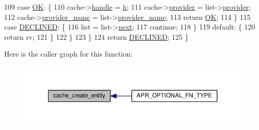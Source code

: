 \begin{DoxyCode}
109         \textcolor{keywordflow}{case} \hyperlink{group__APACHE__CORE__DAEMON_gaba51915c87d64af47fb1cc59348961c9}{OK}: \{
110             cache->\hyperlink{structcache__request__rec_ade71ff36fe9a713fd081fa45524151f1}{handle} = \hyperlink{group__apr__hash_ga0d6dcb41ca5e794b318df5f6fd273ee2}{h};
111             cache->\hyperlink{structcache__request__rec_aa97c7f2b0167adee182cce9f2c66b0eb}{provider} = list->\hyperlink{structcache__provider__list_a1e1caa5b70698f255962728326dc1be3}{provider};
112             cache->\hyperlink{structcache__request__rec_ad15b24a12858815a315f37152111b41d}{provider\_name} = list->\hyperlink{structcache__provider__list_a0bd2adbaa02f1aa6af1971fd24b09b6a}{provider\_name};
113             \textcolor{keywordflow}{return} \hyperlink{group__APACHE__CORE__DAEMON_gaba51915c87d64af47fb1cc59348961c9}{OK};
114         \}
115         \textcolor{keywordflow}{case} \hyperlink{group__APACHE__CORE__DAEMON_ga9eba11ca86461a3ae319311d64682dda}{DECLINED}: \{
116             list = list->\hyperlink{structcache__provider__list_a87c07afc8bb63fe7fd2e9274e60341a9}{next};
117             \textcolor{keywordflow}{continue};
118         \}
119         \textcolor{keywordflow}{default}: \{
120             \textcolor{keywordflow}{return} rv;
121         \}
122         \}
123     \}
124     \textcolor{keywordflow}{return} \hyperlink{group__APACHE__CORE__DAEMON_ga9eba11ca86461a3ae319311d64682dda}{DECLINED};
125 \}
\end{DoxyCode}


Here is the caller graph for this function\+:
\nopagebreak
\begin{figure}[H]
\begin{center}
\leavevmode
\includegraphics[width=350pt]{group__Cache__storage_gaa8317a8938235881e7f1368031b33bb9_icgraph}
\end{center}
\end{figure}


